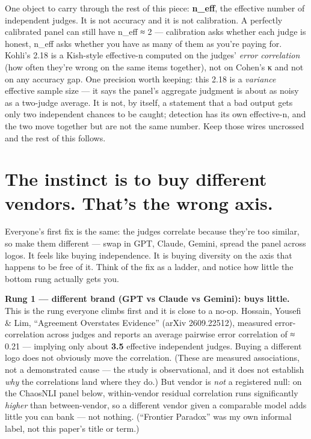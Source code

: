 \documentclass[11pt]{article}
\begin{document}
One object to carry through the rest of this piece: \textbf{n\_eff}, the effective number of independent judges. It is not accuracy and it is not calibration. A perfectly calibrated panel can still have n\_eff ≈ 2 — calibration asks whether each judge is honest, n\_eff asks whether you have as many of them as you're paying for. Kohli's 2.18 is a Kish-style effective-n computed on the judges' \emph{error correlation} (how often they're wrong on the same items together), not on Cohen's κ and not on any accuracy gap. One precision worth keeping: this 2.18 is a \emph{variance} effective sample size — it says the panel's aggregate judgment is about as noisy as a two-judge average. It is not, by itself, a statement that a bad output gets only two independent chances to be caught; detection has its own effective-n, and the two move together but are not the same number. Keep those wires uncrossed and the rest of this follows.

\section*{The instinct is to buy different vendors. That's the wrong axis.}

Everyone's first fix is the same: the judges correlate because they're too similar, so make them different — swap in GPT, Claude, Gemini, spread the panel across logos. It feels like buying independence. It is buying diversity on the axis that happens to be free of it. Think of the fix as a ladder, and notice how little the bottom rung actually gets you.

\textbf{Rung 1 — different brand (GPT vs Claude vs Gemini): buys little.} This is the rung everyone climbs first and it is close to a no-op. Hossain, Yousefi \& Lim, ``Agreement Overstates Evidence'' (arXiv 2609.22512), measured error-correlation across judges and reports an average pairwise error correlation of ≈ 0.21 — implying only about \textbf{3.5} effective independent judges. %
Buying a different logo does not obviously move the correlation. (These are measured associations, not a demonstrated cause — the study is observational, and it does not establish \emph{why} the correlations land where they do.) But vendor is \emph{not} a registered null: on the ChaosNLI panel below, within-vendor residual correlation runs significantly \emph{higher} than between-vendor, so a different vendor given a comparable model adds little you can bank — not nothing. (``Frontier Paradox'' was my own informal label, not this paper's title or term.)
\end{document}
